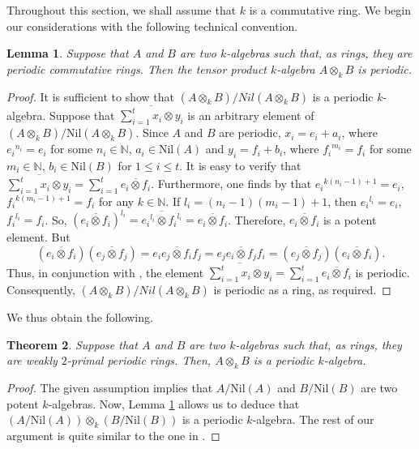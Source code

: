 \documentclass[12pt]{amsart}
\newtheorem{thm}{Theorem}[section]
\newtheorem{lem}[thm]{Lemma}
\theoremstyle{definition}
\theoremstyle{remark}
\numberwithin{equation}{section}
\begin{document}
\medskip

Throughout this section, we shall assume that $k$ is a commutative ring. We begin our considerations with the following technical convention.

\begin{lem}\label{lemma5.1}
Suppose that $A$ and $B$ are two $k$-algebras such that, as rings, they are periodic commutative rings. Then the tensor product $k$-algebra $A \otimes_k B$ is periodic.
\end{lem}

\begin{proof}
It is sufficient to show that $(A \otimes_k B)/Nil(A \otimes_k B)$ is a periodic $k$-algebra. Suppose that $\overline{\sum_{i=1}^t x_i \otimes y_i}$ is an arbitrary element of $(A \otimes_k B)/\mathrm{Nil}(A \otimes_k B)$. Since $A$ and $B$ are periodic, $x_i=e_i+a_i$, where  ${e_i}^{n_i}=e_i$ for some $n_i \in \mathbb{N}$, $a_i \in \mathrm{Nil}(A)$ and $y_i=f_i+b_i$, where ${f_i}^{m_i}=f_i$ for some $m_i \in \mathbb{N}$, $b_i \in \mathrm{Nil}(B)$ for $1 \leq i \leq t$. It is easy to verify that $\overline{\sum_{i=1}^t x_i \otimes y_i}=\sum_{i=1}^t \overline{e_i \otimes f_i}$. Furthermore, one finds by \cite[Lemma 2.3]{BCL} that ${e_i}^{k(n_i-1)+1}=e_i$, ${f_i}^{k(m_i-1)+1}=f_i$ for any $k \in \mathbb{N}$. If $l_i=(n_i-1)(m_i-1)+1$, then ${e_i}^{l_i}=e_i$, ${f_i}^{l_i}=f_i$. So, ${(\overline{e_i \otimes f_i})}^{l_i}=\overline{{e_i}^{l_i} \otimes {f_i}^{l_i}}=\overline{e_i \otimes f_i}$. Therefore, $\overline{e_i \otimes f_i}$ is a potent element. But
\[(\overline{e_i \otimes f_i})(\overline{e_j \otimes f_j})=\overline{e_ie_j \otimes f_if_j}=\overline{e_je_i \otimes f_jf_i}=(\overline{e_j \otimes f_j})(\overline{e_i \otimes f_i}). \]
Thus, in conjunction with \cite[Lemma 2.6]{BCL}, the element $\overline{\sum_{i=1}^t x_i \otimes y_i}=\sum_{i=1}^t \overline{e_i \otimes f_i}$ is periodic. Consequently, $(A \otimes_k B)/Nil(A \otimes_k B)$ is periodic as a ring, as required.
\end{proof}

We thus obtain the following.

\begin{thm}\label{theorem5.2}
Suppose that $A$ and $B$ are two $k$-algebras such that, as rings, they are weakly $2$-primal periodic rings. Then, $A \otimes_k B$ is a periodic $k$-algebra.
\end{thm}

\begin{proof}
The given assumption implies that $A/\mathrm{Nil}(A)$ and $B/\mathrm{Nil}(B)$ are two potent $k$-algebras. Now, Lemma \ref{lemma5.1} allows us to deduce that $(A/\mathrm{Nil}(A)) \otimes_k (B/\mathrm{Nil}(B))$ is a periodic $k$-algebra. The rest of our argument is quite similar to the one in \cite[Theorem 2.3]{BMA}.
\end{proof}
\end{document}
